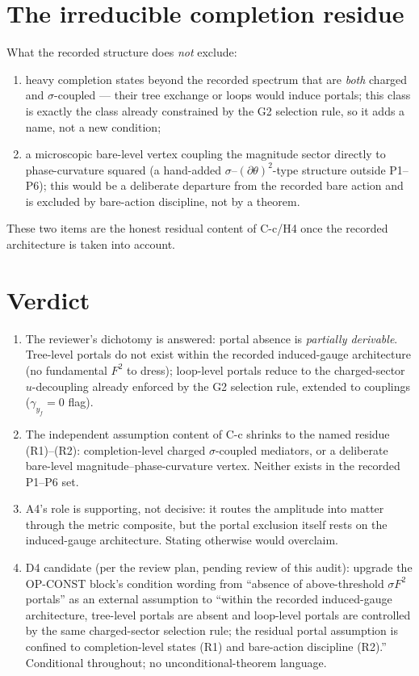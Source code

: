 \documentclass[11pt,a4paper]{article}
\begin{document}
\section{The irreducible completion residue}
What the recorded structure does \emph{not} exclude:
\begin{enumerate}[leftmargin=1.9em,itemsep=2pt,label=(R\arabic*)]
\item heavy completion states beyond the recorded spectrum that are
\emph{both} charged and $\sigma$-coupled --- their tree exchange or loops
would induce portals; this class is exactly the class already constrained by
the G2 selection rule, so it adds a name, not a new condition;
\item a microscopic bare-level vertex coupling the magnitude sector directly
to phase-curvature squared (a hand-added $\sigma$--$(\partial\theta)^2$-type
structure outside P1--P6); this would be a deliberate departure from the
recorded bare action and is excluded by bare-action discipline, not by a
theorem.
\end{enumerate}
These two items are the honest residual content of C-c/H4 once the recorded
architecture is taken into account.

\section{Verdict}
\begin{enumerate}[leftmargin=1.9em,itemsep=2pt,label=\textbf{V\arabic*.}]
\item The reviewer's dichotomy is answered: portal absence is
\emph{partially derivable}. Tree-level portals do not exist within the
recorded induced-gauge architecture (no fundamental $F^2$ to dress);
loop-level portals reduce to the charged-sector $u$-decoupling already
enforced by the G2 selection rule, extended to couplings
($\gamma_{y_f}=0$ flag).
\item The independent assumption content of C-c shrinks to the named residue
(R1)--(R2): completion-level charged $\sigma$-coupled mediators, or a
deliberate bare-level magnitude--phase-curvature vertex. Neither exists in
the recorded P1--P6 set.
\item A4's role is supporting, not decisive: it routes the amplitude into
matter through the metric composite, but the portal exclusion itself rests on
the induced-gauge architecture. Stating otherwise would overclaim.
\item D4 candidate (per the review plan, pending review of this audit):
upgrade the OP-CONST block's condition wording from ``absence of
above-threshold $\sigma F^2$ portals'' as an external assumption to
``within the recorded induced-gauge architecture, tree-level portals are
absent and loop-level portals are controlled by the same charged-sector
selection rule; the residual portal assumption is confined to
completion-level states (R1) and bare-action discipline (R2).'' Conditional
throughout; no unconditional-theorem language.
\end{enumerate}
\end{document}
